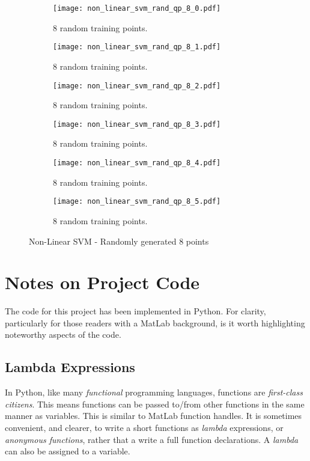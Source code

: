 \documentclass[10pt, a4paper,reqno]{amsart}
\begin{document}
\begin{figure}[H]
	\centering	
	\begin{subfigure}{0.5\textwidth}
		\centering
		\texttt{[image: non\_linear\_svm\_rand\_qp\_8\_0.pdf]}
		\caption{8 random training points.}
	\end{subfigure}%
	\begin{subfigure}{0.5\textwidth}
		\centering
		\texttt{[image: non\_linear\_svm\_rand\_qp\_8\_1.pdf]}
		\caption{8 random training points.}
	\end{subfigure}
	\begin{subfigure}{0.5\textwidth}
		\centering
		\texttt{[image: non\_linear\_svm\_rand\_qp\_8\_2.pdf]}
		\caption{8 random training points.}
	\end{subfigure}%
	\begin{subfigure}{0.5\textwidth}
		\centering
		\texttt{[image: non\_linear\_svm\_rand\_qp\_8\_3.pdf]}
		\caption{8 random training points.}
	\end{subfigure}
	\begin{subfigure}{0.5\textwidth}
		\centering
		\texttt{[image: non\_linear\_svm\_rand\_qp\_8\_4.pdf]}
		\caption{8 random training points.}
	\end{subfigure}%
	\begin{subfigure}{0.5\textwidth}
		\centering
		\texttt{[image: non\_linear\_svm\_rand\_qp\_8\_5.pdf]}
		\caption{8 random training points.}
	\end{subfigure}
	\caption{Non-Linear SVM - Randomly generated 8 points}
\end{figure}


%
%
\clearpage\section{Notes on Project Code}

The code for this project has been implemented in Python. For clarity, particularly for those readers with a MatLab background, is it worth highlighting noteworthy aspects of the code.

\subsection{Lambda Expressions}
In Python, like many \emph{functional} programming languages, functions are \emph{first-class citizens}. This means functions can be passed to/from other functions in the same manner as variables. This is similar to MatLab function handles. It is sometimes convenient, and clearer, to write a short functions as \emph{lambda} expressions, or \emph{anonymous functions}, rather that a write a full function declarations. A \emph{lambda} can also be assigned to a variable.
\end{document}
